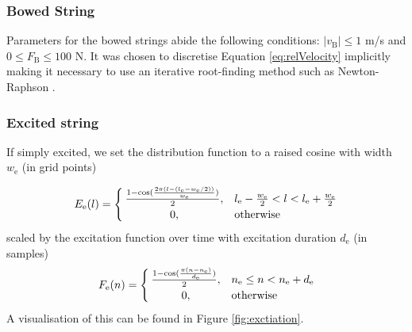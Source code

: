 \subsubsection{Bowed String}
Parameters for the bowed strings abide the following conditions: $|v_\text{B}| \leq 1$ m/s and $0 \leq F_\text{B} \leq 100$ N. It was chosen to discretise Equation \eqref{eq:relVelocity} implicitly %
making it necessary to use an iterative root-finding method such as Newton-Raphson \cite{Wallis1685}.

\subsubsection{Excited string}
If simply excited, we set the distribution function to a raised cosine with width $w_\text{e}$ (in grid points)

\begin{equation}\label{eq:discDist}
    E_\text{e}(l) = 
    \begin{cases}
        \hfil \frac{1 - \cos(\frac{2 \pi (l - (l_\text{e}-w_\text{e}/2))}{w_\text{e}})}{2}, & l_\text{e} -  \frac{w_\text{e}}{2} < l < l_\text{e} + \frac{w_\text{e}}{2} \\
        \hfil 0, &\text{otherwise}
    \end{cases}
\end{equation}
scaled by the excitation function over time with excitation duration $d_\text{e}$ (in samples)
\begin{equation}\label{eq:discExcitation}
    F_\text{e}(n) = 
    \begin{cases}
        \frac{1 - \cos(\frac{\pi (n - n_\text{e})}{d_\text{e}})}{2}, & n_\text{e} \leq n < n_\text{e}+d_\text{e}\\
        \hfil 0, &\text{otherwise}
    \end{cases}
\end{equation}
A visualisation of this can be found in Figure \ref{fig:exctiation}.

